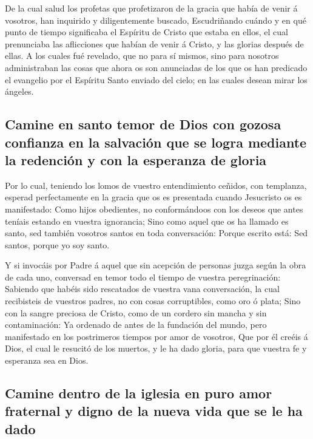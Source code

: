  De la cual salud los profetas que profetizaron de la
gracia que había de venir á vosotros, han inquirido y diligentemente
buscado,  Escudriñando cuándo y en qué punto de tiempo
significaba el Espíritu de Cristo que estaba en ellos, el cual
prenunciaba las aflicciones que habían de venir á Cristo, y las glorias
después de ellas.  A los cuales fué revelado, que no para
sí mismos, sino para nosotros administraban las cosas que ahora os son
anunciadas de los que os han predicado el evangelio por el Espíritu
Santo enviado del cielo; en las cuales desean mirar los ángeles.

\hypertarget{camine-en-santo-temor-de-dios-con-gozosa-confianza-en-la-salvaciuxf3n-que-se-logra-mediante-la-redenciuxf3n-y-con-la-esperanza-de-gloria}{%
\subsection{Camine en santo temor de Dios con gozosa confianza en la
salvación que se logra mediante la redención y con la esperanza de
gloria}\label{camine-en-santo-temor-de-dios-con-gozosa-confianza-en-la-salvaciuxf3n-que-se-logra-mediante-la-redenciuxf3n-y-con-la-esperanza-de-gloria}}

 Por lo cual, teniendo los lomos de vuestro entendimiento
ceñidos, con templanza, esperad perfectamente en la gracia que os es
presentada cuando Jesucristo os es manifestado:  Como
hijos obedientes, no conformándoos con los deseos que antes teníais
estando en vuestra ignorancia;  Sino como aquel que os ha
llamado es santo, sed también vosotros santos en toda conversación:
 Porque escrito está: Sed santos, porque yo soy santo.

 Y si invocáis por Padre á aquel que sin acepción de
personas juzga según la obra de cada uno, conversad en temor todo el
tiempo de vuestra peregrinación:  Sabiendo que habéis
sido rescatados de vuestra vana conversación, la cual recibisteis de
vuestros padres, no con cosas corruptibles, como oro ó plata;
 Sino con la sangre preciosa de Cristo, como de un
cordero sin mancha y sin contaminación:  Ya ordenado de
antes de la fundación del mundo, pero manifestado en los postrimeros
tiempos por amor de vosotros,  Que por él creéis á Dios,
el cual le resucitó de los muertos, y le ha dado gloria, para que
vuestra fe y esperanza sea en Dios.

\hypertarget{camine-dentro-de-la-iglesia-en-puro-amor-fraternal-y-digno-de-la-nueva-vida-que-se-le-ha-dado}{%
\subsection{Camine dentro de la iglesia en puro amor fraternal y digno
de la nueva vida que se le ha
dado}\label{camine-dentro-de-la-iglesia-en-puro-amor-fraternal-y-digno-de-la-nueva-vida-que-se-le-ha-dado}}

